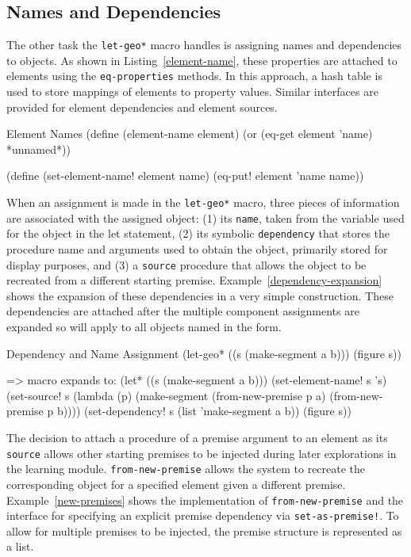 \subsection{Names and Dependencies}

The other task the \texttt{let-geo*} macro handles is assigning names
and dependencies to objects. As shown in Listing~\ref{element-name},
these properties are attached to elements using the
\texttt{eq-properties} methods.  In this approach, a hash table is
used to store mappings of elements to property values. Similar
interfaces are provided for element dependencies and element sources.

\begin{code-listing}
[label=element-name]
{Element Names}
(define (element-name element)
  (or (eq-get element 'name)
      *unnamed*))

(define (set-element-name! element name)
  (eq-put! element 'name name))
\end{code-listing}

When an assignment is made in the \texttt{let-geo*} macro, three
pieces of information are associated with the assigned object: (1) its
\texttt{name}, taken from the variable used for the object in the let
statement, (2) its symbolic \texttt{dependency} that stores the
procedure name and arguments used to obtain the object, primarily
stored for display purposes, and (3) a \texttt{source} procedure that
allows the object to be recreated from a different starting
premise. Example~\ref{dependency-expansion} shows the expansion of
these dependencies in a very simple construction. These dependencies
are attached after the multiple component assignments are expanded so
will apply to all objects named in the form.

\begin{repl-example}
[label=dependency-expansion]
{Dependency and Name Assignment}
(let-geo*
    ((s (make-segment a b)))
  (figure s))

=> macro expands to:
(let* ((s (make-segment a b)))
  (set-element-name! s 's)
  (set-source! s
   (lambda (p)
     (make-segment (from-new-premise p a) (from-new-premise p b))))
  (set-dependency! s (list 'make-segment a b))
  (figure s))
\end{repl-example}

The decision to attach a procedure of a premise argument to an element
as its \texttt{source} allows other starting premises to be injected
during later explorations in the learning
module. \texttt{from-new-premise} allows the system to recreate the
corresponding object for a specified element given a different
premise. Example~\ref{new-premises} shows the implementation of
\texttt{from-new-premise} and the interface for specifying an explicit
premise dependency via \texttt{set-as-premise!}.  To allow for
multiple premises to be injected, the premise structure is represented
as a list.

